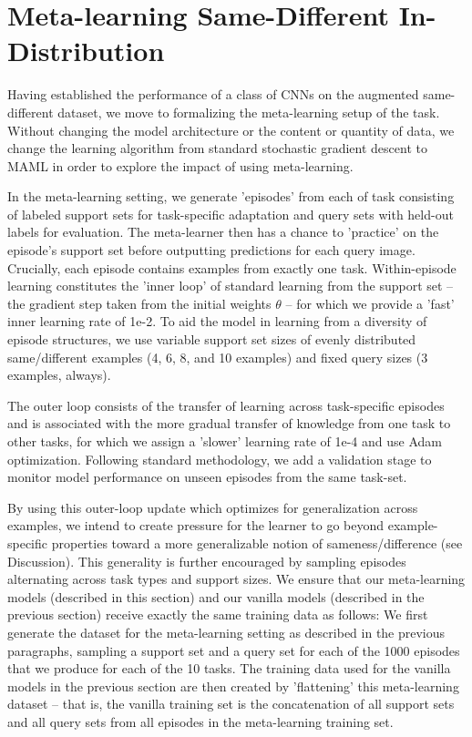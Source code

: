 \documentclass[10pt,letterpaper]{article}
\begin{document}
\section{Meta-learning Same-Different In-Distribution}

Having established the performance of a class of CNNs on the augmented same-different dataset, we move to formalizing the meta-learning setup of the task. Without changing the model architecture or the content or quantity of data, we change the learning algorithm from standard stochastic gradient descent to MAML in order to explore the impact of using meta-learning.  

In the meta-learning setting, we generate 'episodes' from each of 
task
consisting of labeled support sets for task-specific adaptation and query sets with held-out labels for evaluation. The meta-learner then has a chance to 'practice' on the episode's support set before outputting predictions for each query image. Crucially, each episode contains examples from exactly one task. Within-episode learning constitutes the 'inner loop' of standard learning from the support set -- the gradient step taken from the initial weights $\theta$ -- for which we provide a 'fast' inner learning rate of 1e-2. To aid the model in learning from a diversity of episode structures, we use variable support set sizes of evenly distributed same/different examples (4, 6, 8, and 10 examples) and fixed query sizes (3 examples, always). 


The outer loop consists of the transfer of learning across task-specific episodes and is associated with the more gradual transfer of knowledge from one task to other tasks, for which we assign a 'slower' learning rate of 1e-4 and use Adam optimization. Following standard methodology, we add a validation stage to monitor model performance on unseen episodes from the same task-set. 

By using this outer-loop update which optimizes for generalization across examples, we intend to create pressure for the learner to go beyond example-specific properties toward a more generalizable notion of sameness/difference (see Discussion). This generality is further encouraged by sampling episodes alternating across task types and support sizes.
We ensure that our meta-learning models (described in this section) and our vanilla models (described in the previous section) receive exactly the same training data as follows: We first generate the dataset for the meta-learning setting as described in the previous paragraphs, sampling a support set and a query set for each of the 1000 episodes that we produce for each of the 10 tasks. The training data used for the vanilla models in the previous section are then created by 'flattening' this meta-learning dataset -- that is, the vanilla training set is the concatenation of all support sets and all query sets from all episodes in the meta-learning training set. 
\end{document}
